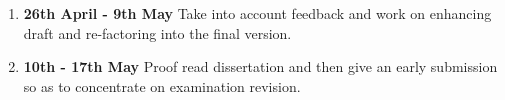 \documentclass[12pt,a4paper,twoside]{article}
\begin{document}
\begin{enumerate}
\item \textbf{26th April - 9th May}
Take into account feedback and work on enhancing draft and re-factoring into the final version.

\item \textbf{10th - 17th May}
Proof read dissertation and then give an early submission so as to concentrate on examination revision.

\end{enumerate}


 
\end{document}
